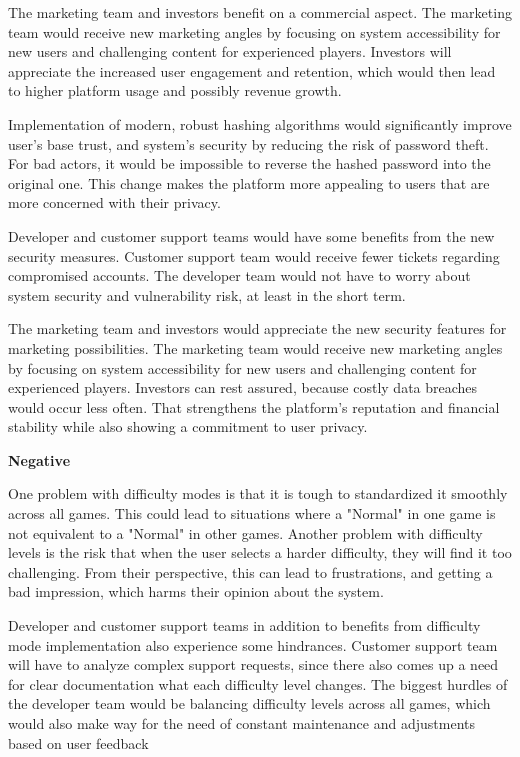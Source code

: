 \documentclass[11pt,a4paper]{article}
\newcommand{\heading}[1]{\vspace{1em}\noindent\textbf{#1}\par\vspace{0.5em}}
\begin{document}
The marketing team and investors benefit on a commercial aspect. The marketing team would receive new marketing angles by focusing on system accessibility for new users and challenging content for experienced players. Investors will appreciate the increased user engagement and retention, which would then lead to higher platform usage and possibly revenue growth.

Implementation of modern, robust hashing algorithms would significantly improve user's base trust, and system's security by reducing the risk of password theft. For bad actors, it would be impossible to reverse the hashed password into the original one. This change makes the platform more appealing to users that are more concerned with their privacy. 

Developer and customer support teams would have some benefits from the new security measures. Customer support team would receive fewer tickets regarding compromised accounts. The developer team would not have to worry about system security and vulnerability risk, at least in the short term.

The marketing team and investors would appreciate the new security features for marketing possibilities. The marketing team would receive new marketing angles by focusing on system accessibility for new users and challenging content for experienced players. Investors can rest assured, because costly data breaches would occur less often. That strengthens the platform's reputation and financial stability while also showing a commitment to user privacy.

\heading{Negative}
One problem with difficulty modes is that it is tough to standardized it smoothly across all games. This could lead to situations where a "Normal" in one game is not equivalent to a "Normal" in other games. Another problem with difficulty levels is the risk that when the user selects a harder difficulty, they will find it too challenging. From their perspective, this can lead to frustrations, and getting a bad impression, which harms their opinion about the system.

Developer and customer support teams in addition to benefits from difficulty mode implementation also experience some hindrances. Customer support team will have to analyze complex support requests, since there also comes up a need for clear documentation what each difficulty level changes. The biggest hurdles of the developer team would be balancing difficulty levels across all games, which would also make way for the need of constant maintenance and adjustments based on user feedback
\end{document}
